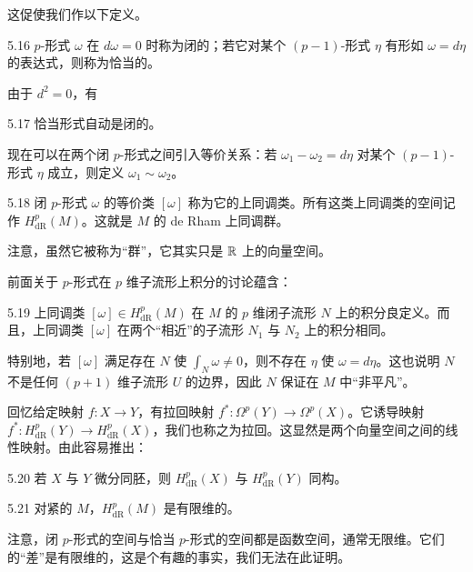 这促使我们作以下定义。

\begin{definition}{5.16}
  $p$-形式 $\omega$ 在 $d\omega=0$ 时称为闭的；若它对某个 $(p-1)$-形式 $\eta$ 有形如 $\omega=d\eta$ 的表达式，则称为恰当的。
\end{definition}

由于 $d^2=0$，有

\begin{proposition}{5.17}
  恰当形式自动是闭的。
\end{proposition}

现在可以在两个闭 $p$-形式之间引入等价关系：若 $\omega_1-\omega_2=d\eta$ 对某个 $(p-1)$-形式 $\eta$ 成立，则定义 $\omega_1\sim\omega_2$。

\begin{definition}{5.18}
  闭 $p$-形式 $\omega$ 的等价类 $[\omega]$ 称为它的上同调类。所有这类上同调类的空间记作 $H^p_{\mathrm{dR}}(M)$。这就是 $M$ 的 de Rham 上同调群。
\end{definition}

注意，虽然它被称为“群”，它其实只是 $\mathbb{R}$ 上的向量空间。

前面关于 $p$-形式在 $p$ 维子流形上积分的讨论蕴含：

\begin{proposition}{5.19}
  上同调类 $[\omega]\in H^p_{\mathrm{dR}}(M)$ 在 $M$ 的 $p$ 维闭子流形 $N$ 上的积分良定义。而且，上同调类 $[\omega]$ 在两个“相近”的子流形 $N_1$ 与 $N_2$ 上的积分相同。
\end{proposition}

特别地，若 $[\omega]$ 满足存在 $N$ 使 $\int_N\omega\ne0$，则不存在 $\eta$ 使 $\omega=d\eta$。这也说明 $N$ 不是任何 $(p+1)$ 维子流形 $U$ 的边界，因此 $N$ 保证在 $M$ 中“非平凡”。

回忆给定映射 $f:X\to Y$，有拉回映射 $f^*:\Omega^p(Y)\to\Omega^p(X)$。它诱导映射 $f^*:H^p_{\mathrm{dR}}(Y)\to H^p_{\mathrm{dR}}(X)$，我们也称之为拉回。这显然是两个向量空间之间的线性映射。由此容易推出：

\begin{proposition}{5.20}
  若 $X$ 与 $Y$ 微分同胚，则 $H^p_{\mathrm{dR}}(X)$ 与 $H^p_{\mathrm{dR}}(Y)$ 同构。
\end{proposition}

\begin{proposition}{5.21}
  对紧的 $M$，$H^p_{\mathrm{dR}}(M)$ 是有限维的。
\end{proposition}

注意，闭 $p$-形式的空间与恰当 $p$-形式的空间都是函数空间，通常无限维。它们的“差”是有限维的，这是个有趣的事实，我们无法在此证明。

